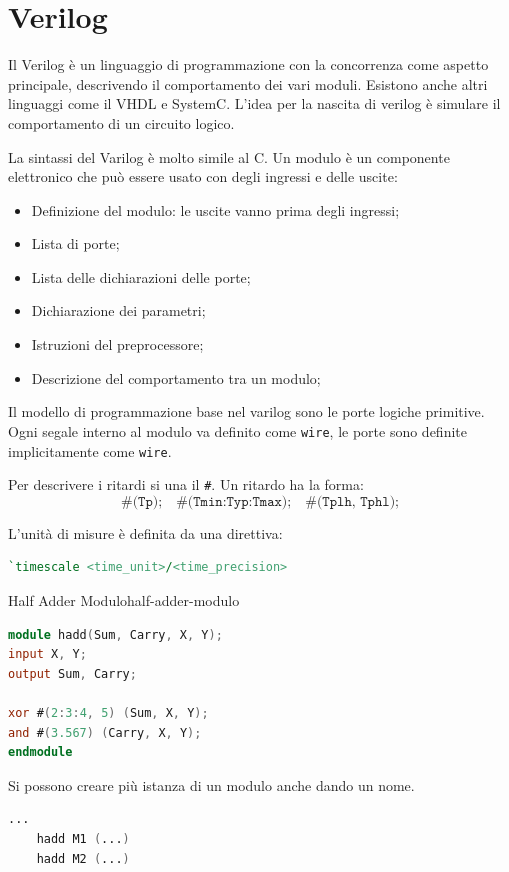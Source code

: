 \documentclass[12pt]{article}
\begin{document}
\newpage
\section{Verilog}
Il Verilog \`e un linguaggio di programmazione con la concorrenza come aspetto principale, descrivendo il comportamento dei vari moduli. Esistono anche altri linguaggi come il VHDL e SystemC. L'idea per la nascita di verilog \`e simulare il comportamento di un circuito logico.

La sintassi del Varilog \`e molto simile al C. Un modulo \`e un componente elettronico che pu\`o essere usato con degli ingressi e delle uscite:
\begin{itemize}
    \item Definizione del modulo: le uscite vanno prima degli ingressi;
    \item Lista di porte;
    \item Lista delle dichiarazioni delle porte;
    \item Dichiarazione dei parametri;
    \item Istruzioni del preprocessore;
    \item Descrizione del comportamento tra un modulo;
\end{itemize}

Il modello di programmazione base nel varilog sono le porte logiche primitive. Ogni segale interno al modulo va definito come \texttt{wire}, le porte sono definite implicitamente come \texttt{wire}.

Per descrivere i ritardi si una il \texttt{\#}. Un ritardo ha la forma:
\[ \texttt{\#(Tp);}\quad \texttt{\#(Tmin:Typ:Tmax);}\quad \texttt{\#(Tplh, Tphl);} \]

L'unit\`a di misure \`e definita da una direttiva:
\begin{lstlisting}[language=verilog]
    `timescale <time_unit>/<time_precision>
\end{lstlisting}

\begin{example}{Half Adder Modulo}{half-adder-modulo}
\begin{lstlisting}[language=verilog]
module hadd(Sum, Carry, X, Y);
input X, Y;
output Sum, Carry;

xor #(2:3:4, 5) (Sum, X, Y);
and #(3.567) (Carry, X, Y);
endmodule
\end{lstlisting}
\end{example}

Si possono creare pi\`u istanza di un modulo anche dando un nome. 
\begin{lstlisting}[language=verilog]
    ...
    hadd M1 (...)
    hadd M2 (...)
\end{lstlisting}
\end{document}
